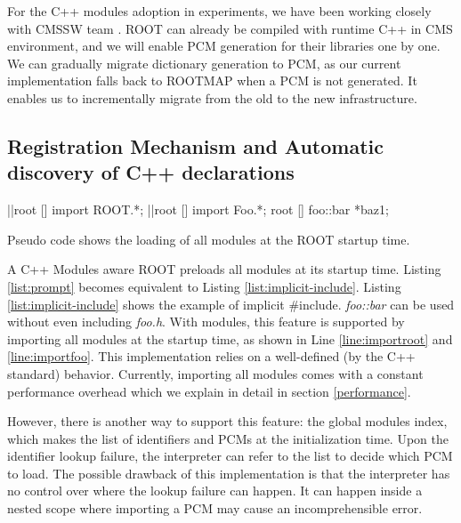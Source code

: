\documentclass{webofc}
\begin{document}

For the C++ modules adoption in experiments, we have been working closely with CMSSW team \cite{cms}. ROOT can already be compiled with runtime C++ in CMS environment, and we will enable PCM generation for their libraries one by one. We can gradually migrate dictionary generation to PCM, as our current implementation falls back to ROOTMAP when a PCM is not generated. It enables us to incrementally migrate from the old to the new infrastructure.

\subsection{Registration Mechanism and Automatic discovery of C++ declarations}
\label{subsec:preloading}

\begin{listing}[h]
    \noindent
    \begin{minipage}[h]{.7\textwidth}
    \begin{cppcode*}{}
    |\label{line:importroot}|root [] import ROOT.*;
    |\label{line:importfoo}|root [] import Foo.*;
    root [] foo::bar *baz1;
    \end{cppcode*}
    \end{minipage}
    \caption{Pseudo code shows the loading of all modules at the ROOT startup time.}
    \label{list:implicit-include}
\end{listing}

A C++ Modules aware ROOT preloads all modules at its startup time. Listing \ref{list:prompt} becomes equivalent to Listing \ref{list:implicit-include}. Listing \ref{list:implicit-include} shows the example of implicit \#include. {\it foo::bar} can be used without even including {\it foo.h}. With modules, this feature is supported by importing all modules at the startup time, as shown in Line \ref{line:importroot} and \ref{line:importfoo}. This implementation relies on a well-defined (by the C++ standard) behavior. Currently, importing all modules comes with a constant performance overhead which we explain in detail in section \ref{performance}.

However, there is another way to support this feature: the global modules index, which makes the list of identifiers and PCMs at the initialization time. Upon the identifier lookup failure, the interpreter can refer to the list to decide which PCM to load. The possible drawback of this implementation is that the interpreter has no control over where the lookup failure can happen. It can happen inside a nested scope where importing a PCM may cause an incomprehensible error.
\end{document}
